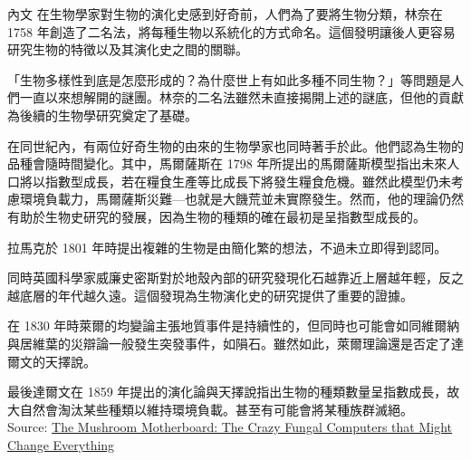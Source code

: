 \documentclass{article}
\begin{document}
\begin{boxpar}[Emerald]{內文}
在生物學家對生物的演化史感到好奇前，人們為了要將生物分類，林奈在 1758 年創造了二名法，將每種生物以系統化的方式命名。這個發明讓後人更容易研究生物的特徵以及其演化史之間的關聯。

「生物多樣性到底是怎麼形成的？為什麼世上有如此多種不同生物？」等問題是人們一直以來想解開的謎團。林奈的二名法雖然未直接揭開上述的謎底，但他的貢獻為後續的生物學研究奠定了基礎。

在同世紀內，有兩位好奇生物的由來的生物學家也同時著手於此。他們認為生物的品種會隨時間變化。其中，馬爾薩斯在 1798 年所提出的馬爾薩斯模型指出未來人口將以指數型成長，若在糧食生產等比成長下將發生糧食危機。雖然此模型仍未考慮環境負載力，馬爾薩斯災難—也就是大饑荒並未實際發生。然而，他的理論仍然有助於生物史研究的發展，因為生物的種類的確在最初是呈指數型成長的。

拉馬克於 1801 年時提出複雜的生物是由簡化繁的想法，不過未立即得到認同。

同時英國科學家威廉史密斯對於地殼內部的研究發現化石越靠近上層越年輕，反之越底層的年代越久遠。這個發現為生物演化史的研究提供了重要的證據。

在 1830 年時萊爾的均變論主張地質事件是持續性的，但同時也可能會如同維爾納與居維葉的災辯論一般發生突發事件，如隕石。雖然如此，萊爾理論還是否定了達爾文的天擇說。

最後達爾文在 1859
    年提出的演化論與天擇說指出生物的種類數量呈指數成長，故大自然會淘汰某些種類以維持環境負載。甚至有可能會將某種族群滅絕。\\
Source: \href{https://www.youtube.com/watch?v=5mIWo6dgTmI}{The Mushroom Motherboard: The Crazy Fungal Computers that Might Change Everything}
\end{boxpar}
\end{document}
